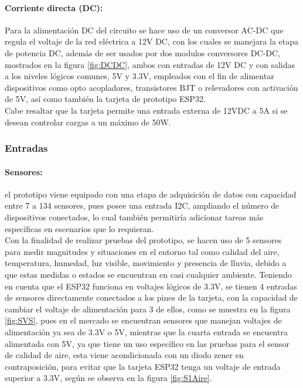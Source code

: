 	\paragraph{Corriente directa (DC):}
		Para la alimentación DC del circuito se hace uso de un conversor AC-DC que regula el voltaje de la red eléctrica a 12V DC, con los cuales se manejara la etapa de potencia DC, además de ser usados por dos modulos conversores DC-DC, mostrados en la figura \ref{fig:DCDC}, ambos con entradas de 12V DC y con salidas a los niveles lógicos comunes, 5V y 3.3V, empleados con el fin de alimentar dispositivos como opto acopladores, transistores BJT o relevadores con activación de 5V, así como también la tarjeta de prototipo ESP32.\\
		
		Cabe resaltar que la tarjeta permite una entrada externa de 12VDC a 5A si se desean controlar cargas a un máximo de 50W.\\
			
	
	\subsubsection{Entradas}
	\paragraph{Sensores:}
		el prototipo viene equipado con una etapa de adquisición de datos con capacidad entre 7 a 134 sensores, pues posee una entrada I2C, ampliando el número de dispositivos conectados, lo cual también permitiría adicionar tareas más específicas en escenarios que lo requieran.\\
		
		Con la finalidad de realizar pruebas del prototipo, se hacen uso de 5 sensores para medir magnitudes y situaciones en el entorno tal como calidad del aire, temperatura, humedad, luz visible, movimiento y presencia de lluvia, debido a que estas medidas o estados se encuentran en casi cualquier ambiente. Teniendo en cuenta que el ESP32 funciona en voltajes lógicos de 3.3V, se tienen 4 entradas de sensores directamente conectados a los pines de la tarjeta, con la capacidad de cambiar el voltaje de alimentación para 3 de ellos, como se muestra en la figura \ref{fig:SVS}, pues en el mercado se encuentran sensores que manejan voltajes de alimentación ya sea de 3.3V o 5V, mientras que la cuarta entrada se encuentra alimentada con 5V, ya que tiene un uso específico en las pruebas para el sensor de calidad de aire, esta viene acondicionada con un diodo zener en contraposición, para evitar que la tarjeta ESP32 tenga un voltaje de entrada superior a 3.3V, según se observa en la figura \ref{fig:S1Aire}.\\
		
